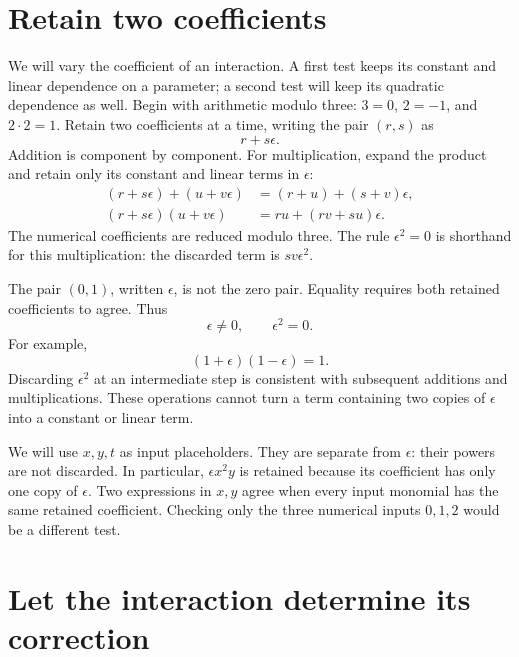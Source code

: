 \documentclass[11pt,letterpaper]{article}
\numberwithin{equation}{section}
\theoremstyle{definition}\newtheorem{example}[theorem]{Example}
\begin{document}
\clearpage
\tableofcontents
\clearpage

\section{Retain two coefficients}\label{sec:parameter}

We will vary the coefficient of an interaction. A first test keeps its constant and linear dependence on a parameter; a second test will keep its quadratic dependence as well. Begin with arithmetic modulo three: \(3=0\), \(2=-1\), and \(2\cdot2=1\). Retain two coefficients at a time, writing the pair \((r,s)\) as
\[
 r+s\epsilon.
\]
Addition is component by component. For multiplication, expand the product and retain only its constant and linear terms in \(\epsilon\):
\begin{align}
 (r+s\epsilon)+(u+v\epsilon)&=(r+u)+(s+v)\epsilon,\\
 (r+s\epsilon)(u+v\epsilon)&=ru+(rv+su)\epsilon.
 \label{eq:two-coefficients}
\end{align}
The numerical coefficients are reduced modulo three. The rule \(\epsilon^2=0\) is shorthand for this multiplication: the discarded term is \(sv\epsilon^2\).

The pair \((0,1)\), written \(\epsilon\), is not the zero pair. Equality requires both retained coefficients to agree. Thus
\[
 \epsilon\ne0,\qquad \epsilon^2=0.
\]
For example,
\[
 (1+\epsilon)(1-\epsilon)=1.
\]
Discarding \(\epsilon^2\) at an intermediate step is consistent with subsequent additions and multiplications. These operations cannot turn a term containing two copies of \(\epsilon\) into a constant or linear term.

We will use \(x,y,t\) as input placeholders. They are separate from \(\epsilon\): their powers are not discarded. In particular, \(\epsilon x^2y\) is retained because its coefficient has only one copy of \(\epsilon\). Two expressions in \(x,y\) agree when every input monomial has the same retained coefficient. Checking only the three numerical inputs \(0,1,2\) would be a different test.

\section{Let the interaction determine its correction}\label{sec:repair}
\end{document}
